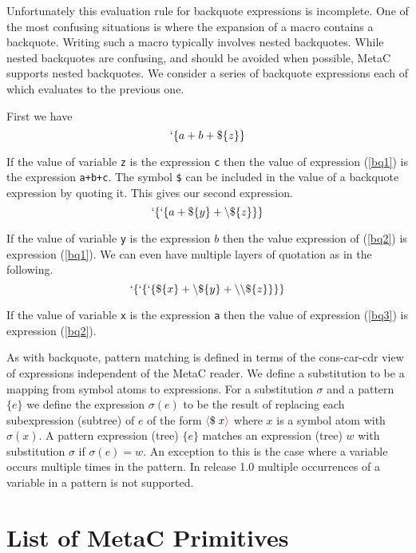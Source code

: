 \documentclass{article}
\newcommand{\fopen}{{\color{red} \langle}}
\newcommand{\fclose}{{\color{red} \rangle}}
\begin{document}
Unfortunately this evaluation rule for backquote expressions is incomplete.  One of the most
confusing situations is where the expansion of a macro contains a backquote.  Writing such a macro typically involves nested backquotes.  While nested backquotes
are confusing, and should be avoided when possible, MetaC supports nested backquotes.  We consider a series of backquote expressions each of which evaluates to the previous one.

First we have
\begin{equation}
\label{bq1}
`\{a+b+\$\{z\}\}
\end{equation}

If the value of variable {\tt z} is the expression {\tt c} then the value of expression (\ref{bq1}) is the expression {\tt a+b+c}.
The symbol {\tt \$} can be included in the value of a backquote expression by quoting it.  This gives our second expression.
\begin{equation}
\label{bq2}
`\{`\{a + \$\{y\} + \backslash\$\{z\}\}\}
\end{equation}

If the value of variable {\tt y} is the expression $b$ then the value expression of (\ref{bq2}) is expression (\ref{bq1}).
We can even have multiple layers of quotation as in the following.
\begin{equation}
\label{bq3}
`\{`\{`\{\$\{x\} + \backslash\$\{y\} + \backslash\backslash\$\{z\}\}\}\}
\end{equation}

If the value of variable {\tt x} is the expression {\tt a} then the value of expression (\ref{bq3}) is expression (\ref{bq2}).

As with backquote, pattern matching is defined in terms of the cons-car-cdr view of expressions independent of the MetaC reader.  We define a substitution to be a mapping from
symbol atoms to expressions. For a substitution $\sigma$ and a pattern $\{e\}$ we define the expression $\sigma(e)$
to be the result of replacing each subexpression (subtree) of $e$ of the form $\fopen \$\;x \fclose$ where $x$ is a symbol atom with $\sigma(x)$.  A pattern expression (tree) $\{e\}$ matches an expression (tree) $w$ with substitution $\sigma$
if $\sigma(e) = w$. An exception to this is the case where a variable occurs multiple times in the pattern.  In release 1.0 multiple occurrences of a variable in a pattern is not supported.

\section{List of MetaC Primitives}
\end{document}
